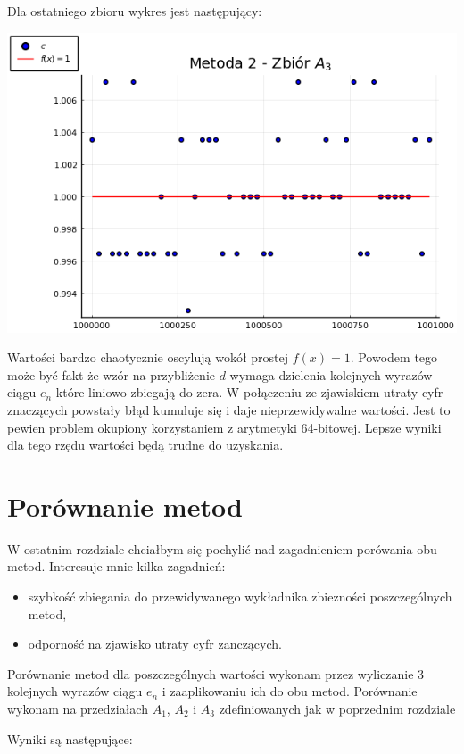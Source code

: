 \documentclass[11pt,wide]{mwart}
\begin{document}
Dla ostatniego zbioru wykres jest następujący:

\vspace{1cm}
\centerline{\includegraphics[scale=0.8]{chart2_3}}
\vspace{1cm}

Wartości bardzo chaotycznie oscylują wokół prostej $f(x) = 1$.
Powodem tego może być fakt że wzór na przybliżenie $d$ wymaga dzielenia kolejnych wyrazów ciągu $e_n$ które liniowo zbiegają do zera. W połączeniu ze zjawiskiem utraty cyfr znaczących
powstały błąd kumuluje się i daje nieprzewidywalne wartości. Jest to pewien problem okupiony korzystaniem z arytmetyki 64-bitowej. Lepsze wyniki dla tego rzędu wartości będą trudne do uzyskania.

\section{Porównanie metod}

W ostatnim rozdziale chciałbym się pochylić nad zagadnieniem porówania obu metod.
Interesuje mnie kilka zagadnień:
\begin{itemize}
\item szybkość zbiegania do przewidywanego wykładnika zbiezności poszczególnych metod,
\item odporność na zjawisko utraty cyfr zanczących.
\end{itemize}

Porównanie metod dla poszczególnych wartości wykonam przez wyliczanie 3 kolejnych wyrazów ciągu $e_n$ i zaaplikowaniu ich do obu metod.
Porównanie wykonam na przedziałach $A_1$, $A_2$ i $A_3$ zdefiniowanych jak w poprzednim rozdziale

Wyniki są następujące:
\end{document}
